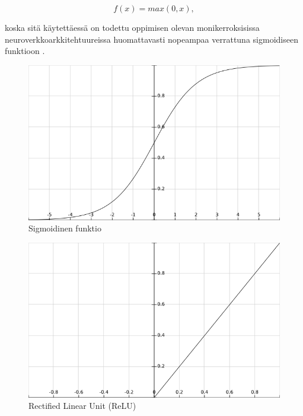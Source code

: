 \documentclass[finnish]{tktltiki2}
\theoremstyle{definition}
\theoremstyle{remark}
\begin{document}
    \begin{equation}
      f(x) = max(0, x),
      \label{eq:relu-func}
    \end{equation}

    \noindent koska sitä käytettäessä on todettu oppimisen olevan monikerroksisissa neuroverkkoarkkitehtuureissa huomattavasti nopeampaa verrattuna sigmoidiseen funktioon \cite{nature-lecun15}.

    \begin{figure}[h]
      \centering
      \includegraphics[scale=0.3]{sigmoid}
      \caption{Sigmoidinen funktio}
      \label{pic:sigmoid}
    \end{figure}

    \begin{figure}[h]
      \centering
      \includegraphics[scale=0.3]{relu}
      \caption{Rectified Linear Unit (ReLU)}
      \label{pic:relu}
    \end{figure}

\end{document}
